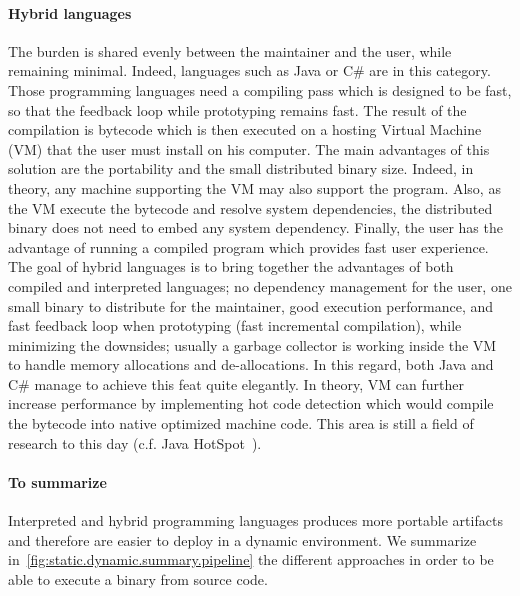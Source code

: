 \paragraph{Hybrid languages} The burden is shared evenly between the maintainer and the user, while remaining minimal.
Indeed, languages such as Java or C\# are in this category. Those programming languages need a compiling pass which is
designed to be fast, so that the feedback loop while prototyping remains fast. The result of the compilation is bytecode
which is then executed on a hosting Virtual Machine (VM) that the user must install on his computer. The main
advantages of this solution are the portability and the small distributed binary size. Indeed, in theory, any machine
supporting the VM may also support the program. Also, as the VM execute the bytecode and resolve system dependencies,
the distributed binary does not need to embed any system dependency. Finally, the user has the advantage of running a
compiled program which provides fast user experience. The goal of hybrid languages is to bring together the advantages
of both compiled and interpreted languages; no dependency management for the user, one small binary to distribute for
the maintainer, good execution performance, and fast feedback loop when prototyping (fast incremental compilation),
while minimizing the downsides; usually a garbage collector is working inside the VM to handle memory allocations and
de-allocations. In this regard, both Java and C\# manage to achieve this feat quite elegantly. In theory, VM can further
increase performance by implementing hot code detection which would compile the bytecode into native optimized machine
code. This area is still a field of research to this day (c.f. Java
HotSpot~\parencite{xie.improving,kotzmann.2008.hotspot,halli.2016.java-hpc}).

\paragraph{To summarize} Interpreted and hybrid programming languages produces more portable artifacts and therefore are
easier to deploy in a dynamic environment. We summarize in~\cref{fig:static.dynamic.summary.pipeline} the different
approaches in order to be able to execute a binary from source code.

